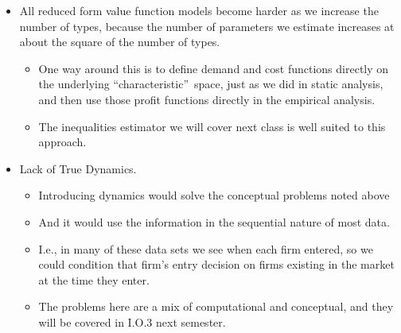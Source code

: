 \begin{frame}%


\begin{itemize}
\item All reduced form value function models become harder as we increase
the number of types, because the number of parameters we estimate increases
at about the square of the number of types.

\begin{itemize}
\item One way around this is to define demand and cost functions directly on
the underlying \textquotedblleft characteristic\textquotedblright\ space,
just as we did in static analysis, and then use those profit functions
directly in the empirical analysis.

\item The inequalities estimator we will cover next class is well suited to
this approach.
\end{itemize}

\item Lack of True Dynamics.

\begin{itemize}
\item Introducing dynamics would solve the conceptual problems noted above

\item And it would use the information in the sequential nature of most data.

\item I.e., in many of these data sets we see when each firm entered, so we
could condition that firm's entry decision on firms existing in the market
at the time they enter.

\item The problems here are a mix of computational and conceptual, and they
will be covered in I.O.3 next semester.
\end{itemize}
\end{itemize}

\end{frame}%


